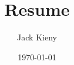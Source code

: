 \documentclass[11pt, a4paper, titlepage, oneside]{article}
\title{Resume}
\author{Jack Kieny}
\date{\today}
\begin{document}
    
    \begin{tcolorbox}
        \begin{minipage}{4.5cm}
            
        \end{minipage}
    \end{tcolorbox}
\end{document}
